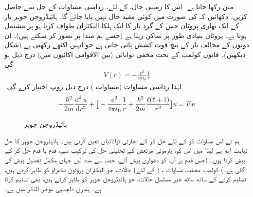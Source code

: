 میں رکھا جاتا ہے۔ اس کا زمینی حال،   کے لئے،  رداسی مساوات کے حل سے حاصل کریں۔ دکھائیں کہ 
 کی صورت میں کوئی مقید حال نہیں پایا جائے گا۔
ہائیڈروجن جوہر بار  کے  ایک بھاری پروٹان جس کے گرد بار  کا ایک ہلکا الیکٹران طواف کرتا ہو پر مشتمل ہوتا ہے۔ پروٹان بنیادی طور پر ساکن رہتا ہے (جسے ہم مبدا پر تصور کر سکتے ہیں)۔  ان دونوں کے مخالف بار کے بیچ قوت کشش پائی جاتی ہے جو انہیں اکٹھے رکھتی ہے  (شکل  دیکھیں)۔  قانون کولمب کے تحت مخفی توانائی (بین الاقوامی اکائیوں میں)  درج ذیل ہو گی  
 \begin{align}\label{مساوات_ابعادی_کولمب_مخفیہ}
V(r)=-\frac{e^{2}}{4\pi\epsilon_{0}}\frac{1}{r} 
\end{align}
لہٰذا رداسی مساوات (مساوات  )  درج ذیل روپ اختیار کرے گی۔
\begin{align}\label{مساوات_ابعادی_رداسی_کولمب}
-\frac{\hslash^{2}}{2m}\frac{\dif^{\,2}{u}}{\dif r^{2}}+\big[-\frac{e^{2}}{4\pi\epsilon_{0}}\frac{1}{r}+\frac{\hslash^{2}}{2m}\frac{\ell(\ell+1)}{r^{2}}\big]u=Eu 
\end{align}


\begin{figure}
\centering
{}
\caption{ہائیڈروجن  جوہر}
\label{شکل_تین_ابعادی_ہائیڈروجن_جوہر}
\end{figure}


 ہم نے اس مساوات کو     کے لئے حل کر کے اجازتی توانائیاں  تعین کرنی ہیں۔  ہائیڈروجن جوہر کا حل نہایت اہم ہے لہٰذا میں اس کو، ہارمونی مرتعش کے تحلیلی حل کی ترکیب سے، قدم با قدم حل کر کے پیش کرتا ہوں۔ (جس قدم پر آپ کو دشواری پیش آئے، حصہ  سے مدد لیں جہاں مکمل تفصیل پیش کی گئی ہے۔)  کولمب مخفیہ،  مساوات ،    ( کے لئے)   حالات، جو الیکٹران پروٹون بکھراو کو ظاہر کرتے ہیں، تسلیم کرنے کے ساتھ ساتھ غیر مسلسل  حالات، جو ہائیڈروجن جوہر کو ظاہر کرتے ہیں، بھی تسلیم کرتا ہے۔ ہماری دلچسپی موخر الذکر میں ہے۔

